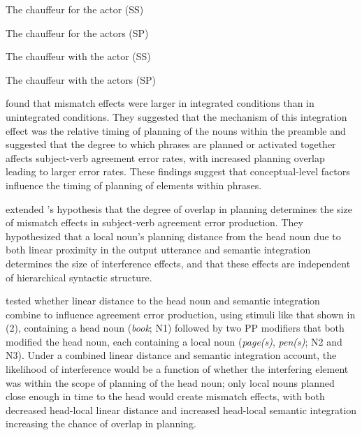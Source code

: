 \documentclass[12pt,titlepage]{article}
\newcommand{\IGNORE}[1]{} %
\begin{document}
    \begin{myexample}
\label{SP-ex}
\begin{examples}

    \item \label{SPintSS} The chauffeur for the actor
    \hfill (SS)\hspace{16em}

    \item \label{SPintSP} The chauffeur for the actors
    \hfill (SP)\hspace{16em}

    \item \label{SPunintSS}The chauffeur with the actor
    \hfill (SS)\hspace{16em}

    \item \label{SPwithunintSP}The chauffeur with the actors
    \hfill (SP)\hspace{16em}

\end{examples}
\end{myexample}


 \citeauthor{SolomonPearlmutter04} found that mismatch effects were larger in integrated conditions than in unintegrated conditions. They suggested that the mechanism of this integration effect was the relative timing of planning of the nouns within the preamble and suggested that the degree to which phrases are planned or activated together affects subject-verb agreement error rates, with increased planning overlap leading to larger error rates.  These findings suggest that conceptual-level factors influence the timing of planning of elements within phrases.




 extended \citeauthor{SolomonPearlmutter04}'s \citeyear{SolomonPearlmutter04} hypothesis that the degree of overlap in planning determines the size of mismatch effects in subject-verb agreement error production.  They hypothesized that a local noun's planning distance from the head noun due to both linear proximity in the output utterance and semantic integration determines the size of interference effects, and that these effects are independent of hierarchical syntactic structure.

 tested whether linear distance to the head noun and semantic integration combine to influence agreement error
production, using stimuli like that shown in (2), containing a head noun (\textit{book}; N1) followed by two PP modifiers that both modified the head noun, each containing a local noun (\textit{page(s)}, \textit{pen(s)}; N2 and N3). \IGNORE{The
hierarchical distance of N2 and N3 was held constant (viz. both nouns modified the head noun).  }Under a combined linear distance and semantic
integration account, the likelihood of interference would be a function of
whether the interfering element was within the scope of planning of the
head noun; only local nouns planned close enough in time to the head would create mismatch effects, with both decreased head-local linear
distance and increased head-local semantic integration increasing the
chance of overlap in planning.
\end{document}
